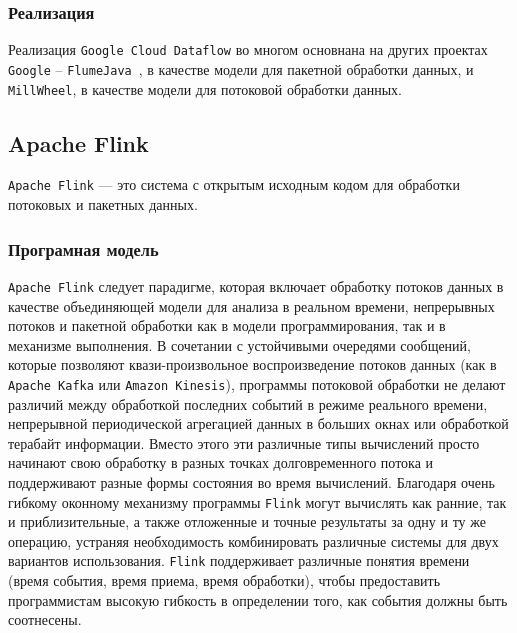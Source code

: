 \subsubsection{Реализация}

Реализация \texttt{Google Cloud Dataflow} во многом основнана на других проектах \texttt{Google} -- \texttt{FlumeJava}~\cite{flumejava}, в качестве модели для пакетной обработки данных, и \texttt{MillWheel}, в качестве модели для потоковой обработки данных.

\subsection{Apache Flink}

\texttt{Apache Flink} --- это система с открытым исходным кодом для обработки потоковых и пакетных данных.

\subsubsection{Програмная модель}

\texttt{Apache Flink} следует парадигме, которая включает обработку потоков данных в качестве объединяющей модели для анализа в реальном времени, непрерывных потоков и пакетной обработки как в модели программирования, так и в механизме выполнения.
В сочетании с устойчивыми очередями сообщений, которые позволяют квази-произвольное воспроизведение потоков данных (как в \texttt{Apache Kafka} или \texttt{Amazon Kinesis}), программы потоковой обработки не делают различий между обработкой последних событий в режиме реального времени, непрерывной периодической агрегацией данных в больших окнах или обработкой терабайт информации.
Вместо этого эти различные типы вычислений просто начинают свою обработку в разных точках долговременного потока и поддерживают разные формы состояния во время вычислений. 
Благодаря очень гибкому оконному механизму программы \texttt{Flink} могут вычислять как ранние, так и приблизительные, а также отложенные и точные результаты за одну и ту же операцию, устраняя необходимость комбинировать различные системы для двух вариантов использования. 
\texttt{Flink} поддерживает различные понятия времени (время события, время приема, время обработки), чтобы предоставить программистам высокую гибкость в определении того, как события должны быть соотнесены.

